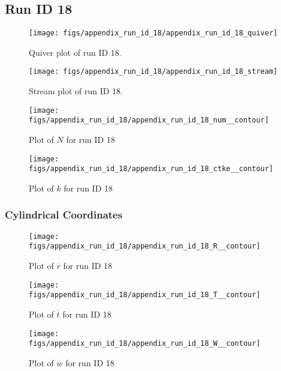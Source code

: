 \subsection{Run ID 18}
\begin{figure}[H]
\centering
\texttt{[image: figs/appendix\_run\_id\_18/appendix\_run\_id\_18\_quiver]}
\caption{Quiver plot of run ID 18.}
\label{fig:appendix_run_id_18_quiver}
\end{figure}


\begin{figure}[H]
\centering
\texttt{[image: figs/appendix\_run\_id\_18/appendix\_run\_id\_18\_stream]}
\caption{Stream plot of run ID 18.}
\label{fig:appendix_run_id_18_stream}
\end{figure}


\begin{figure}[H]
\centering
\texttt{[image: figs/appendix\_run\_id\_18/appendix\_run\_id\_18\_num\_\_contour]}
\caption{Plot of $N$ for run ID 18}
\label{fig:appendix_run_id_18_num__contour}
\end{figure}


\begin{figure}[H]
\centering
\texttt{[image: figs/appendix\_run\_id\_18/appendix\_run\_id\_18\_ctke\_\_contour]}
\caption{Plot of $k$ for run ID 18}
\label{fig:appendix_run_id_18_ctke__contour}
\end{figure}


\subsubsection{Cylindrical Coordinates}
\begin{figure}[H]
\centering
\texttt{[image: figs/appendix\_run\_id\_18/appendix\_run\_id\_18\_R\_\_contour]}
\caption{Plot of $\overline{r}$ for run ID 18}
\label{fig:appendix_run_id_18_R__contour}
\end{figure}


\begin{figure}[H]
\centering
\texttt{[image: figs/appendix\_run\_id\_18/appendix\_run\_id\_18\_T\_\_contour]}
\caption{Plot of $\overline{t}$ for run ID 18}
\label{fig:appendix_run_id_18_T__contour}
\end{figure}


\begin{figure}[H]
\centering
\texttt{[image: figs/appendix\_run\_id\_18/appendix\_run\_id\_18\_W\_\_contour]}
\caption{Plot of $\overline{w}$ for run ID 18}
\label{fig:appendix_run_id_18_W__contour}
\end{figure}


